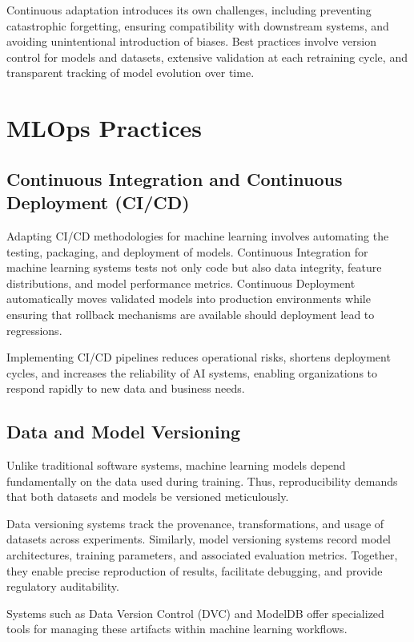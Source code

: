 \documentclass[openany]{book}
\begin{document}
Continuous adaptation introduces its own challenges, including preventing 
catastrophic forgetting, ensuring compatibility with downstream systems, and 
avoiding unintentional introduction of biases. Best practices involve version 
control for models and datasets, extensive validation at each retraining cycle, 
and transparent tracking of model evolution over time.

\section{MLOps Practices}

\subsection{Continuous Integration and Continuous Deployment (CI/CD)}
Adapting CI/CD methodologies for machine learning involves automating the 
testing, packaging, and deployment of models. Continuous Integration for machine 
learning systems tests not only code but also data integrity, feature 
distributions, and model performance metrics. Continuous Deployment 
automatically moves validated models into production environments while ensuring 
that rollback mechanisms are available should deployment lead to regressions.

Implementing CI/CD pipelines reduces operational risks, shortens deployment 
cycles, and increases the reliability of AI systems, enabling organizations to 
respond rapidly to new data and business needs.

\subsection{Data and Model Versioning}
Unlike traditional software systems, machine learning models depend 
fundamentally on the data used during training. Thus, reproducibility demands 
that both datasets and models be versioned meticulously.

Data versioning systems track the provenance, transformations, and usage of 
datasets across experiments. Similarly, model versioning systems record model 
architectures, training parameters, and associated evaluation metrics. Together, 
they enable precise reproduction of results, facilitate debugging, and provide 
regulatory auditability.

Systems such as Data Version Control (DVC) and ModelDB offer specialized tools 
for managing these artifacts within machine learning workflows.
\end{document}
